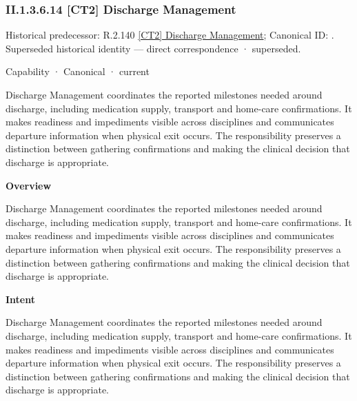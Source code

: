 \subsubsection*{II.1.3.6.14 [CT2] Discharge Management}
\label{navigation:II.1.3.6.14}

{\small Historical predecessor: R.2.140 \hyperref[element:c57c0721ab0040ccb24e88e5e92e8cf8]{[CT2] Discharge Management}; Canonical ID: \texttt{}. Superseded historical identity — direct correspondence · superseded.}\par
\label{element:ec5e8d6732764aa489c2dd7630fc8fef}
{\small Capability · Canonical · current}\par

Discharge Management coordinates the reported milestones needed around discharge, including medication supply, transport and home-care confirmations. It makes readiness and impediments visible across disciplines and communicates departure information when physical exit occurs. The responsibility preserves a distinction between gathering confirmations and making the clinical decision that discharge is appropriate.



\textbf{Overview}



Discharge Management coordinates the reported milestones needed around discharge, including medication supply, transport and home-care confirmations. It makes readiness and impediments visible across disciplines and communicates departure information when physical exit occurs. The responsibility preserves a distinction between gathering confirmations and making the clinical decision that discharge is appropriate.



\textbf{Intent}



Discharge Management coordinates the reported milestones needed around discharge, including medication supply, transport and home-care confirmations. It makes readiness and impediments visible across disciplines and communicates departure information when physical exit occurs. The responsibility preserves a distinction between gathering confirmations and making the clinical decision that discharge is appropriate.



